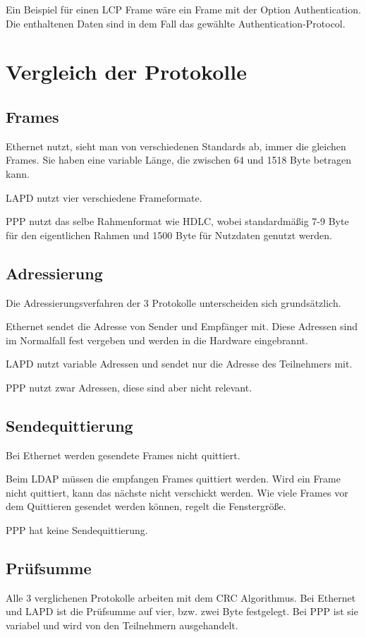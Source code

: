 \documentclass[12pt, a4paper, ngerman]{article}
\begin{document}
Ein Beispiel für einen LCP Frame wäre ein Frame mit der Option Authentication. Die enthaltenen Daten sind in dem Fall das gewählte  Authen\-ti\-ca\-tion-Protocol.

\section{Vergleich der Protokolle}
\subsection{Frames}
Ethernet nutzt, sieht man von verschiedenen Standards ab, immer die gleichen Frames. Sie haben eine variable Länge, die zwischen 64 und 1518 Byte betragen kann.

LAPD nutzt vier verschiedene Frameformate. 

PPP nutzt das selbe Rahmenformat wie HDLC, wobei standardmäßig 7-9 Byte für den eigentlichen Rahmen und 1500 Byte für Nutzdaten genutzt werden.
\subsection{Adressierung}
Die Adressierungsverfahren der 3 Protokolle unterscheiden sich grund\-sätz\-lich. 

Ethernet sendet die Adresse von Sender und Empfänger mit. Diese Adressen sind im Normalfall fest vergeben und werden in die Hardware eingebrannt.

LAPD nutzt variable Adressen und sendet nur die Adresse des Teilnehmers mit.

PPP nutzt zwar Adressen, diese sind aber nicht relevant.

\subsection{Sendequittierung}
Bei Ethernet werden gesendete Frames nicht quittiert. 

Beim LDAP müssen die empfangen Frames quittiert werden. Wird ein Frame nicht quittiert, kann das nächste nicht verschickt werden. Wie viele Frames vor dem Quittieren gesendet werden können, regelt die Fenstergröße.

PPP hat keine Sendequittierung.

\subsection{Prüfsumme} 
Alle 3 verglichenen Protokolle arbeiten mit dem CRC Algorithmus. Bei Ethernet und LAPD ist die Prüfsumme auf vier, bzw. zwei Byte festgelegt. Bei PPP ist sie variabel und wird von den Teilnehmern ausgehandelt. 
\end{document}
